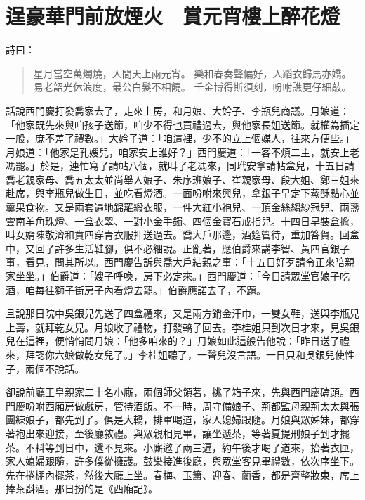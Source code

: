 
\chapter{逞豪華門前放煙火　賞元宵樓上醉花燈}

詩曰：
\begin{quote}
星月當空萬燭燒，人間天上兩元宵。
樂和春奏聲偏好，人蹈衣歸馬亦嬌。
易老韶光休浪度，最公白髮不相饒。
千金博得斯須刻，吩咐譙更仔細敲。
\end{quote}

話說西門慶打發喬家去了，走來上房，和月娘、大妗子、李瓶兒商議。月娘道：「他家既先來與咱孩子送節，咱少不得也買禮過去，與他家長姐送節。就權為插定一般，庶不差了禮數。」大妗子道：「咱這裡，少不的立上個媒人，往來方便些。」月娘道：「他家是孔嫂兒，咱家安上誰好？」西門慶道：「一客不煩二主，就安上老馮罷。」於是，連忙寫了請帖八個，就叫了老馮來，同玳安拿請帖盒兒，十五日請喬老親家母、喬五太太並尚舉人娘子、朱序班娘子、崔親家母、段大姐、鄭三姐來赴席，與李瓶兒做生日，並吃看燈酒。一面吩咐來興兒，拿銀子早定下蒸酥點心並羹果食物。又是兩套遍地錦羅緞衣服，一件大紅小袍兒、一頂金絲縐紗冠兒、兩盞雲南羊角珠燈、一盒衣翠、一對小金手鐲、四個金寶石戒指兒。十四日早裝盒擔，叫女婿陳敬濟和賁四穿青衣服押送過去。喬大戶那邊，酒筵管待，重加答賀。回盒中，又回了許多生活鞋腳，俱不必細說。正亂著，應伯爵來講李智、黃四官銀子事，看見，問其所以。西門慶告訴與喬大戶結親之事：「十五日好歹請令正來陪親家坐坐。」伯爵道：「嫂子呼喚，房下必定來。」西門慶道：「今日請眾堂官娘子吃酒，咱每往獅子街房子內看燈去罷。」伯爵應諾去了，不題。

且說那日院中吳銀兒先送了四盒禮來，又是兩方銷金汗巾，一雙女鞋，送與李瓶兒上壽，就拜乾女兒。月娘收了禮物，打發轎子回去。李桂姐只到次日才來，見吳銀兒在這裡，便悄悄問月娘：「他多咱來的？」月娘如此這般告他說：「昨日送了禮來，拜認你六娘做乾女兒了。」李桂姐聽了，一聲兒沒言語。一日只和吳銀兒使性子，兩個不說話。

卻說前廳王皇親家二十名小廝，兩個師父領著，挑了箱子來，先與西門慶磕頭。西門慶吩咐西廂房做戲房，管待酒飯。不一時，周守備娘子、荊都監母親荊太太與張團練娘子，都先到了。俱是大轎，排軍喝道，家人媳婦跟隨。月娘與眾姊妹，都穿著袍出來迎接，至後廳敘禮。與眾親相見畢，讓坐遞茶，等著夏提刑娘子到才擺茶。不料等到日中，還不見來。小廝邀了兩三遍，約午後才喝了道來，抬著衣匣，家人媳婦跟隨，許多僕從擁護。鼓樂接進後廳，與眾堂客見畢禮數，依次序坐下。先在捲棚內擺茶，然後大廳上坐。春梅、玉簫、迎春、蘭香，都是齊整妝束，席上捧茶斟酒。那日扮的是《西廂記》。

